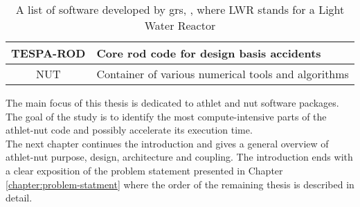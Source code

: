 \begin{table}[htb]
\begin{tabular}{|c|l|}
TESPA-ROD     & Core rod code for design basis accidents                                                                                                                                                     \\ \hline
NUT     & Container of various numerical tools and algorithms \\ \hline
\end{tabular}
\caption[A list of software developed by \acrshort{grs}]{A list of software developed by \acrshort{grs}, \cite{grs:grs-software-products}, where LWR stands for a Light Water Reactor}
\label{table:introduction-grs-software}
\end{table}



The main focus of this thesis is dedicated to \acrshort{athlet} and \acrshort{nut} software packages. The goal of the study is to identify the most compute-intensive parts of the \acrshort{athlet}-\acrshort{nut} code and possibly accelerate its execution time.\\


The next chapter continues the introduction and gives a general overview of \acrshort{athlet}-\acrshort{nut} purpose, design, architecture and coupling. The introduction ends with a clear exposition of the problem statement presented in Chapter \ref{chapter:problem-statment} where the order of the remaining thesis is described in detail.\\

